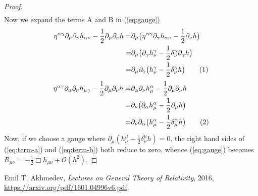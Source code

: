 \documentclass[]{article}
\newcommand\numberthis{\addtocounter{equation}{1}\tag{\theequation}}
\begin{document}
\begin{proof}
\begin{align*}
	\end{align*}
	Now we expand the terms A and B in (\ref{eq:gauge})
	\begin{align*}
	\eta^{\alpha\gamma}\partial_{\mu}\partial_{\gamma}h_{\alpha\nu} -\frac{1}{2}\partial_{\mu}\partial_{\nu}h=&\partial_{\mu}\big(	\eta^{\alpha\gamma}\partial_{\gamma}h_{\alpha\nu} -\frac{1}{2}\partial_{\nu}h\big)\\
	=&\partial_{\mu}\big(\partial_{\gamma}h^{\gamma}_{\nu} -\frac{1}{2}\delta^{\gamma}_{\nu}\partial_{\gamma}h\big)\\
	=&\partial_{\mu}\partial_{\gamma}\big(h^{\gamma}_{\nu} -\frac{1}{2}\delta^{\gamma}_{\nu}h\big)\numberthis\label{eq:term-a}
	\end{align*}
	\begin{align*}
	\eta^{\alpha\gamma}\partial_{\alpha}\partial_{\nu}h_{\mu\gamma}-\frac{1}{2}\partial_{\mu}\partial_{\nu}h=&\partial_{\alpha}\partial_{\nu}h^{\alpha}_{\mu}-\frac{1}{2}\partial_{\mu}\partial_{\nu}h\\
	=& \partial_{\nu}\big( \partial_{\alpha}h^{\alpha}_{\mu}-\frac{1}{2}\partial_{\mu}h  \big) \\
	=& \partial_{\nu}\partial_{\alpha}\big( h^{\alpha}_{\mu}-\frac{1}{2}\delta^{\alpha}_{\mu}h  \big) \numberthis\label{eq:term-b}
	\end{align*}
	Now, if we choose a gauge where $\partial_{\mu}(h^{\mu}_{\nu}-\frac{1}{2}\delta^{\mu}_{\nu}h)=0$, the right hand sides of (\ref{eq:term-a}) and (\ref{eq:term-b}) both reduce to zero, whence (\ref{eq:gauge}) becomes $R_{\mu\nu} = -\frac{1}{2}\Box h_{\mu\nu} + \mathcal{O}(h^2)$.
\end{proof}


\begin{thebibliography}{9}
	
	Emil T. Akhmedev,
	\emph{Lectures on General Theory of Relativity},
	2016,
	\url{https://arxiv.org/pdf/1601.04996v6.pdf}.
	
	
\end{thebibliography}
\end{document}
